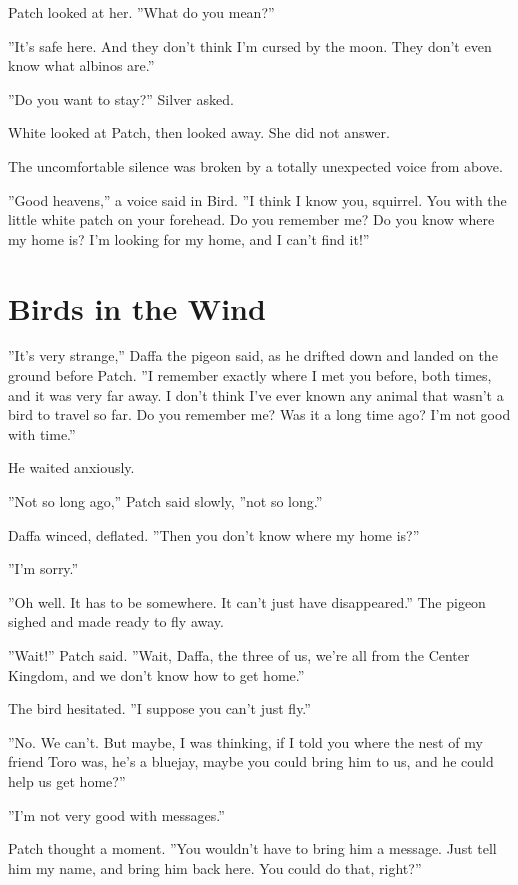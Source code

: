\documentclass[12pt]{book}
\begin{document}
Patch looked at her. ''What do you mean?''

''It's safe here. And they don't think I'm cursed by the moon. They
don't even know what albinos are.''

''Do you want to stay?'' Silver asked.

White looked at Patch, then looked away. She did not answer.

The uncomfortable silence was broken by a totally unexpected voice
from above.

''Good heavens,'' a voice said in Bird. ''I think I know you,
squirrel. You with the little white patch on your forehead. Do you
remember me? Do you know where my home is? I'm looking for my home,
and I can't find it!''


\section{Birds in the Wind}

''It's very strange,'' Daffa the pigeon said, as he drifted down and
landed on the ground before Patch. ''I remember exactly where I met
you before, both times, and it was very far away. I don't think I've
ever known any animal that wasn't a bird to travel so far. Do you
remember me? Was it a long time ago? I'm not good with time.''

He waited anxiously.

''Not so long ago,'' Patch said slowly, ''not so long.''

Daffa winced, deflated. ''Then you don't know where my home is?''

''I'm sorry.''

''Oh well. It has to be somewhere. It can't just have disappeared.''
The pigeon sighed and made ready to fly away.

''Wait!'' Patch said. ''Wait, Daffa, the three of us, we're all from
the Center Kingdom, and we don't know how to get home.''

The bird hesitated. ''I suppose you can't just fly.''

''No. We can't. But maybe, I was thinking, if I told you where the
nest of my friend Toro was, he's a bluejay, maybe you could bring him
to us, and he could help us get home?''

''I'm not very good with messages.''

Patch thought a moment. ''You wouldn't have to bring him a
message. Just tell him my name, and bring him back here. You could do
that, right?''
\end{document}
